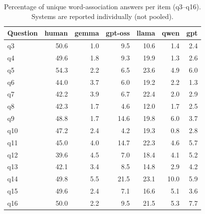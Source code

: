 \begin{table}[t]
\centering
\small
\setlength{\tabcolsep}{4pt}
\renewcommand{\arraystretch}{1.15}
\begin{tabular}{lrrrrrr}
\toprule
Question & human & gemma & gpt-oss & llama & qwen & gpt \\
\midrule
q3 & 50.6 & 1.0 & 9.5 & 10.6 & 1.4 & 2.4 \\
q4 & 49.6 & 1.8 & 9.3 & 19.9 & 1.3 & 2.6 \\
q5 & 54.3 & 2.2 & 6.5 & 23.6 & 4.9 & 6.0 \\
q6 & 44.0 & 3.7 & 6.0 & 19.2 & 2.2 & 1.3 \\
q7 & 42.2 & 3.9 & 6.7 & 22.4 & 2.0 & 2.9 \\
q8 & 42.3 & 1.7 & 4.6 & 12.0 & 1.7 & 2.5 \\
q9 & 48.8 & 1.7 & 14.6 & 19.8 & 6.0 & 3.7 \\
q10 & 47.2 & 2.4 & 4.2 & 19.3 & 0.8 & 2.8 \\
q11 & 45.0 & 4.0 & 14.7 & 22.3 & 4.6 & 5.7 \\
q12 & 39.6 & 4.5 & 7.0 & 18.4 & 4.1 & 5.2 \\
q13 & 42.1 & 3.4 & 8.5 & 14.8 & 2.9 & 4.2 \\
q14 & 49.8 & 5.5 & 21.5 & 23.1 & 10.0 & 5.9 \\
q15 & 49.6 & 2.4 & 7.1 & 16.6 & 5.1 & 3.6 \\
q16 & 50.0 & 2.2 & 9.5 & 21.5 & 5.3 & 7.7 \\
\bottomrule
\end{tabular}
\caption{Percentage of unique word-association answers per item (q3--q16). Systems are reported individually (not pooled).}
\label{tab:wa-unique-pct}
\end{table}